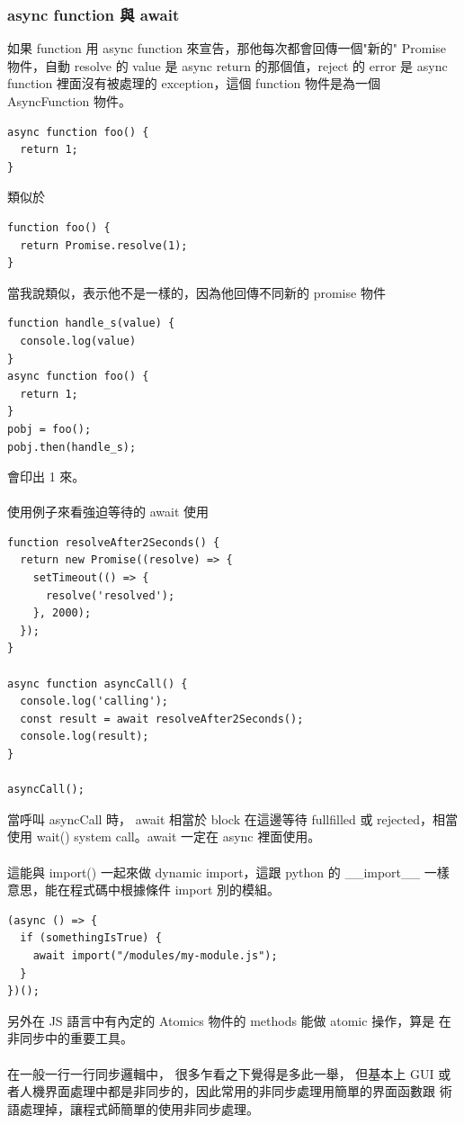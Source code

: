   \subsubsection{async function 與 await}
  如果 function 用 async function 來宣告，那他每次都會回傳一個"新的" Promise
  物件，自動 resolve 的 value 是 async return 的那個值，reject 的 error
  是 async function 裡面沒有被處理的 exception，這個 function 物件是為一個
  AsyncFunction 物件。
  \begin{verbatim}
async function foo() {
  return 1;
}
  \end{verbatim}
  類似於
  \begin{verbatim}
function foo() {
  return Promise.resolve(1);
}
  \end{verbatim}
  當我說類似，表示他不是一樣的，因為他回傳不同新的 promise 物件
  \begin{verbatim}
function handle_s(value) {
  console.log(value)
}
async function foo() {
  return 1;
}
pobj = foo();
pobj.then(handle_s);
  \end{verbatim}
  會印出 1 來。
  \\\\
  使用例子來看強迫等待的 await 使用
  \begin{verbatim}
function resolveAfter2Seconds() {
  return new Promise((resolve) => {
    setTimeout(() => {
      resolve('resolved');
    }, 2000);
  });
}

async function asyncCall() {
  console.log('calling');
  const result = await resolveAfter2Seconds();
  console.log(result);
}

asyncCall();
  \end{verbatim}
  當呼叫 asyncCall 時， await 相當於 block 在這邊等待 fullfilled 或
  rejected，相當使用 wait() system call。await 一定在 async 裡面使用。
  \\\\
  這能與 import() 一起來做 dynamic import，這跟 python 的 \_\_import\_\_
  一樣意思，能在程式碼中根據條件 import 別的模組。
  \begin{verbatim}
(async () => {
  if (somethingIsTrue) {
    await import("/modules/my-module.js");
  }
})();
  \end{verbatim}
  另外在 JS 語言中有內定的 Atomics 物件的 methods 能做 atomic 操作，算是
  在非同步中的重要工具。
  \\\\
  在一般一行一行同步邏輯中， 很多乍看之下覺得是多此一舉， 但基本上 GUI
  或者人機界面處理中都是非同步的，因此常用的非同步處理用簡單的界面函數跟
  術語處理掉，讓程式師簡單的使用非同步處理。
  \\\\

